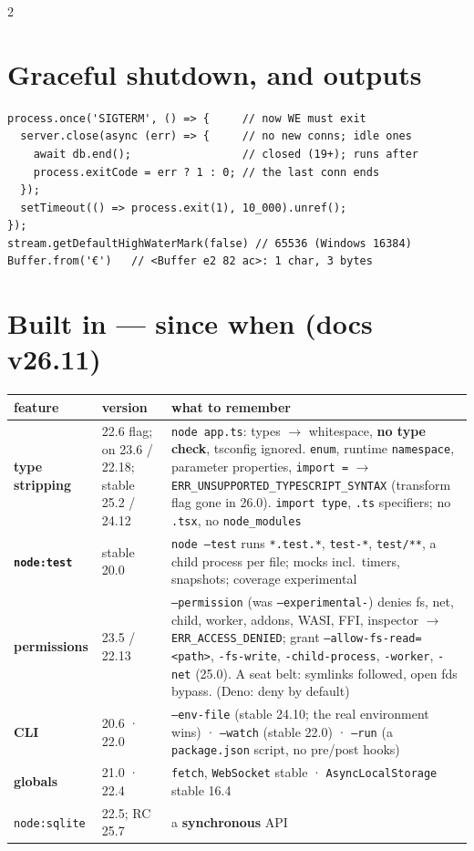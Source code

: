 \documentclass[8pt]{extarticle}
\newcommand\ct[1]{\texttt{#1}}
\begin{document}
\begin{multicols}{2}
\section{Graceful shutdown, and outputs}
\begin{lstlisting}[language=TSSheet]
process.once('SIGTERM', () => {     // now WE must exit
  server.close(async (err) => {     // no new conns; idle ones
    await db.end();                 // closed (19+); runs after
    process.exitCode = err ? 1 : 0; // the last conn ends
  });
  setTimeout(() => process.exit(1), 10_000).unref();
});
stream.getDefaultHighWaterMark(false) // 65536 (Windows 16384)
Buffer.from('€')   // <Buffer e2 82 ac>: 1 char, 3 bytes
\end{lstlisting}

\section{Built in — since when (docs v26.11)}
{\scriptsize\renewcommand{\arraystretch}{1.05}\setlength{\tabcolsep}{2pt}
\begin{tabular}{@{}>{\raggedright}p{12mm}>{\raggedright}p{14mm}>{\raggedright\arraybackslash}p{50mm}@{}}
\toprule
\textbf{feature} & \textbf{version} & \textbf{what to remember}\\
\midrule
\textbf{type stripping} & 22.6 flag; on 23.6 / 22.18; stable 25.2 / 24.12 & \ct{node app.ts}: types $\to$ whitespace, \textbf{no type check}, tsconfig ignored. \ct{enum}, runtime \ct{namespace}, parameter properties, \ct{import =} $\to$ \ct{ERR\_UNSUPPORTED\_}\allowbreak\ct{TYPESCRIPT\_SYNTAX} (transform flag gone in 26.0). \ct{import type}, \ct{.ts} specifiers; no \ct{.tsx}, no \ct{node\_modules}\\
\textbf{\ct{node:test}} & stable 20.0 & \ct{node --test} runs \ct{*.test.*}, \ct{test-*}, \ct{test/**}, a child process per file; mocks incl.\ timers, snapshots; coverage experimental\\
\textbf{permissions} & 23.5 / 22.13 & \ct{--permission} (was \ct{--experimental-}) denies fs, net, child, worker, addons, WASI, FFI, inspector $\to$ \ct{ERR\_ACCESS\_DENIED}; grant \ct{--allow-fs-read=<path>}, \ct{-fs-write}, \ct{-child-process}, \ct{-worker}, \ct{-net} (25.0). A seat belt: symlinks followed, open fds bypass. (Deno: deny by default)\\
\textbf{CLI} & 20.6 · 22.0 & \ct{--env-file} (stable 24.10; the real environment wins) · \ct{--watch} (stable 22.0) · \ct{--run} (a \ct{package.json} script, no pre/post hooks)\\
\textbf{globals} & 21.0 · 22.4 & \ct{fetch}, \ct{WebSocket} stable · \ct{AsyncLocalStorage} stable 16.4\\
\ct{node:sqlite} & 22.5; RC 25.7 & a \textbf{synchronous} API\\
\bottomrule
\end{tabular}}


\end{multicols}
\end{document}

